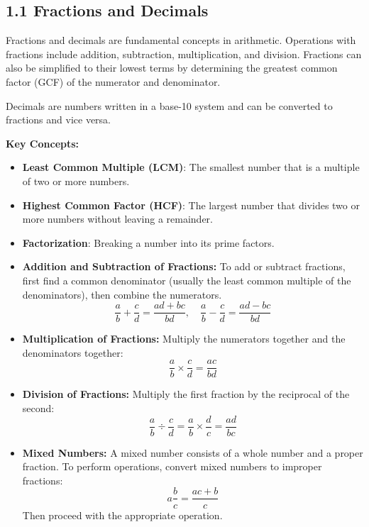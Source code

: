 
\subsection*{1.1 Fractions and Decimals}
Fractions and decimals are fundamental concepts in arithmetic. Operations with fractions include addition, subtraction, multiplication, and division. Fractions can also be simplified to their lowest terms by determining the greatest common factor (GCF) of the numerator and denominator.

Decimals are numbers written in a base-10 system and can be converted to fractions and vice versa. 

\textbf{Key Concepts:}
\begin{itemize}
    \item \textbf{Least Common Multiple (LCM)}: The smallest number that is a multiple of two or more numbers.
    \item \textbf{Highest Common Factor (HCF)}: The largest number that divides two or more numbers without leaving a remainder.
    \item \textbf{Factorization}: Breaking a number into its prime factors.
    \item \textbf{Addition and Subtraction of Fractions:}  
To add or subtract fractions, first find a common denominator (usually the least common multiple of the denominators), then combine the numerators.  
\[
\frac{a}{b} + \frac{c}{d} = \frac{ad + bc}{bd}, \quad
\frac{a}{b} - \frac{c}{d} = \frac{ad - bc}{bd}
\]

\item \textbf{Multiplication of Fractions:}  
Multiply the numerators together and the denominators together:
\[
\frac{a}{b} \times \frac{c}{d} = \frac{ac}{bd}
\]

\item \textbf{Division of Fractions:}  
Multiply the first fraction by the reciprocal of the second:
\[
\frac{a}{b} \div \frac{c}{d} = \frac{a}{b} \times \frac{d}{c} = \frac{ad}{bc}
\]

\item \textbf{Mixed Numbers:}  
A mixed number consists of a whole number and a proper fraction. To perform operations, convert mixed numbers to improper fractions:
\[
a\frac{b}{c} = \frac{ac + b}{c}
\]
Then proceed with the appropriate operation.

\end{itemize}



